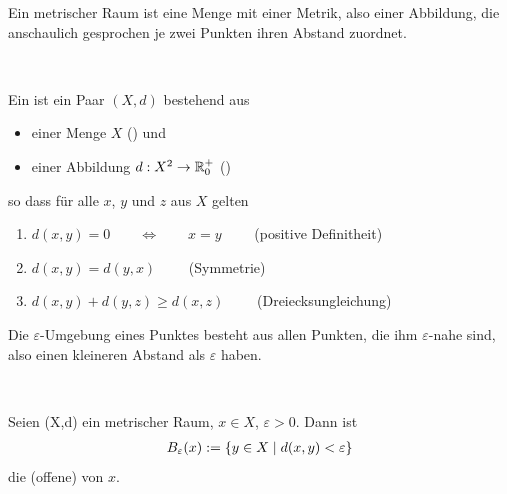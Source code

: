     Ein
    metrischer Raum ist eine Menge mit einer Metrik, also einer Abbildung, die anschaulich gesprochen je zwei Punkten ihren Abstand zuordnet.
    \begin{dfn}\label{def:metr}\ \vspace{8pt}

        \noindent
        Ein  ist ein Paar $(X,d)$ bestehend aus
        \begin{itemize}
            \item einer Menge $X$ () und
            \item einer Abbildung $ d: X^2 \rightarrow \mathbb{R}_0^+$ ()
        \end{itemize}
        so dass für alle $x$, $y$ und $z$ aus $X$ gelten
        \begin{enumerate}
            \item $d(x,y) = 0 \quad \quad \Leftrightarrow \quad \quad x=y \qquad$ (positive Definitheit) 
            \item $d(x,y) = d(y,x) \qquad$ (Symmetrie)
            \item $d(x,y) + d(y,z) \geq d(x,z) \qquad$ (Dreiecksungleichung)
        \end{enumerate}
    \end{dfn}


    Die
    $\varepsilon$-Umgebung eines Punktes besteht aus allen Punkten, die ihm $\varepsilon$-nahe sind, also einen kleineren Abstand als $\varepsilon$ haben.
    \begin{dfn}\label{def:eps-umg}\ \vspace{8pt}

        \noindent
        Seien (X,d) ein metrischer Raum, $x \in X$, $\varepsilon > 0$. Dann ist
        \begin{align*}
            B_\varepsilon(x) := \{y \in X \mid d(x,y) < \varepsilon \}
        \end{align*}
        die (offene)  von $x$.
        
    \end{dfn}


